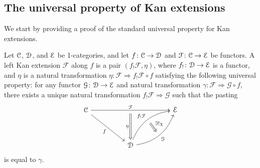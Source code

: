 \documentclass[main.tex]{subfiles}
\begin{document}
\subsection{The universal property of Kan extensions}
\label{ssc:the_universal_property_of_kan_extensions}

We start by providing a proof of the standard universal property for Kan extensions.

\begin{definition}
  Let $\mathcal{C}$, $\mathcal{D}$, and $\mathcal{E}$ be 1-categories, and let $f\colon \mathcal{C} \to \mathcal{D}$ and $\mathcal{F}\colon \mathcal{C} \to \mathcal{E}$ be functors. A left Kan extension $\mathcal{F}$ along $f$ is a pair $( f_{!}\mathcal{F}, \eta )$, where $f_{!}\colon \mathcal{D} \to \mathcal{E}$ is a functor, and $\eta$ is a natural transformation $\eta\colon \mathcal{F} \Rightarrow f_{!}\mathcal{F} \circ f$ satisfying the following universal property: for any functor $\mathcal{G}\colon \mathcal{D} \to \mathcal{E}$ and natural transformation $\gamma\colon \mathcal{F} \Rightarrow \mathcal{G} \circ f$, there exists a unique natural transformation $f_{!}\mathcal{F} \Rightarrow \mathcal{G}$ such that the pasting
  \begin{equation*}
    \begin{tikzcd}[row sep=huge, column sep=huge]
      \category{C}
      \arrow[rr, ""{name=M, below}, "\mathcal{F}"]
      \arrow[dr, swap, "f"]
      && \category{E}
      \\
      & \category{D}
      \arrow[from=M, Rightarrow, "\eta", swap]
      \arrow[ur, bend left, ""{name=LU, swap}, "f_{!}\mathcal{F}"]
      \arrow[ur, bend right, ""{name=LD, swap}, swap, "\mathcal{G}"]
      \arrow[from=LU, to=LD, Rightarrow, "\exists!\chi"]
    \end{tikzcd}
  \end{equation*}
  is equal to $\gamma$.
\end{definition}
\end{document}
